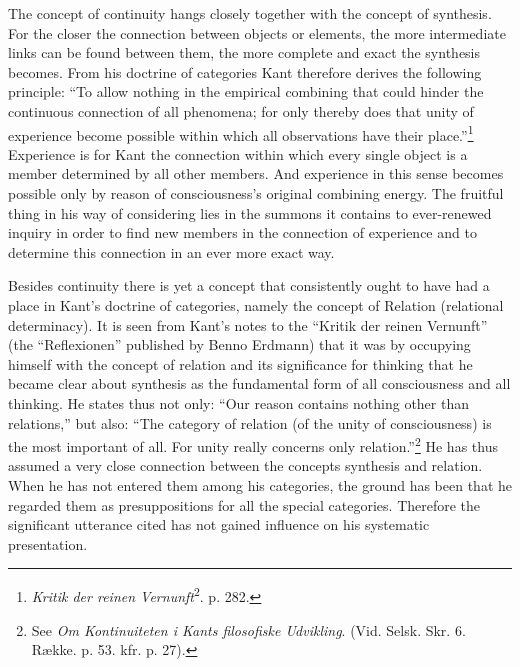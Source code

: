 \documentclass[12pt,a4paper]{book}
\newcommand{\opage}[1]{\marginnote{\footnotesize\textit{[#1]}}}
\begin{document}
The concept of continuity hangs closely together with the concept of
synthesis. For the closer the connection between objects or elements, the
more intermediate links can be found between them, the more complete and
exact the synthesis becomes. From his doctrine of categories Kant therefore
derives the following principle: ``To allow nothing in the empirical
combining that could hinder the continuous connection of all phenomena; for
only thereby does that unity of experience become possible within which all
observations have their place.''\footnote{\emph{Kritik der reinen
Vernunft}\textsuperscript{2}. p. 282.} Experience is for Kant the connection
within which every single object is a member determined by all other
members. And experience in this sense becomes possible only by reason of
consciousness's original combining energy. The fruitful thing in his way of
considering lies in the summons it contains to ever-renewed inquiry in order
to find new members in the connection of experience and to determine this
connection in an ever more exact way.

Besides continuity there is yet a concept that \opage{146}consistently ought to have
had a place in Kant's doctrine of categories, namely the concept of Relation
(relational determinacy). It is seen from Kant's notes to the ``Kritik der
reinen Vernunft'' (the ``Reflexionen'' published by Benno Erdmann) that it
was by occupying himself with the concept of relation and its significance
for thinking that he became clear about synthesis as the fundamental form of
all consciousness and all thinking. He states thus not only: ``Our reason
contains nothing other than relations,'' but also: ``The category of
relation (of the unity of consciousness) is the most important of all. For
unity really concerns only relation.''\footnote{See \emph{Om Kontinuiteten i
Kants filosofiske Udvikling}. (Vid. Selsk. Skr. 6. Række. p. 53. kfr. p.
27).} He has thus assumed a very close connection between the concepts
synthesis and relation. When he has not entered them among his categories,
the ground has been that he regarded them as presuppositions for all the
special categories. Therefore the significant utterance cited has not gained
influence on his systematic presentation.
\end{document}

